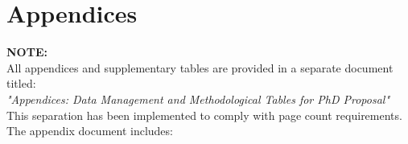 \documentclass[12pt,a4paper]{article}
\begin{document}
\newpage
\pagestyle{empty} %
\tableofcontents
\newpage

\pagestyle{empty} %

\clearpage

\setcounter{page}{1}
\pagestyle{plain} %

\makeatletter
\def\ps@plain{
  \let\@oddhead\@empty
  \def\@oddfoot{\reset@font\hfil\thepage\hfil}
  \let\@evenhead\@empty
  \def\@evenfoot{\reset@font\hfil\thepage\hfil}
}
\makeatother

\pagestyle{plain}














\clearpage
\pagestyle{empty}
\makeatletter
\def\@oddfoot{}
\def\@evenfoot{}
\makeatother


\newpage
\section*{Appendices}
\begin{center}
\large\textbf{NOTE:} \\
\normalsize
All appendices and supplementary tables are provided in a separate document titled:\\
\textit{"Appendices: Data Management and Methodological Tables for PhD Proposal"}\\
\vspace{0.5cm}
This separation has been implemented to comply with page count requirements.\\
\vspace{0.5cm}
The appendix document includes:
\end{center}
\end{document}

